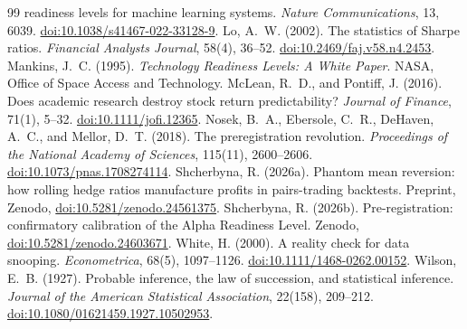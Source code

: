 \documentclass[11pt]{article}
\begin{document}
\begin{thebibliography}{99}
readiness levels for machine learning systems. \emph{Nature Communications}, 13, 6039. \href{https://doi.org/10.1038/s41467-022-33128-9}{doi:10.1038/s41467-022-33128-9}.
 Lo, A.~W. (2002). The statistics of Sharpe ratios. \emph{Financial Analysts Journal},
58(4), 36--52. \href{https://doi.org/10.2469/faj.v58.n4.2453}{doi:10.2469/faj.v58.n4.2453}.
 Mankins, J.~C. (1995). \emph{Technology Readiness Levels: A White Paper}. NASA,
Office of Space Access and Technology.
 McLean, R.~D., and Pontiff, J. (2016). Does academic research destroy stock
return predictability? \emph{Journal of Finance}, 71(1), 5--32. \href{https://doi.org/10.1111/jofi.12365}{doi:10.1111/jofi.12365}.
 Nosek, B.~A., Ebersole, C.~R., DeHaven, A.~C., and Mellor, D.~T. (2018). The
preregistration revolution. \emph{Proceedings of the National Academy of Sciences}, 115(11), 2600--2606. \href{https://doi.org/10.1073/pnas.1708274114}{doi:10.1073/pnas.1708274114}.
 Shcherbyna, R. (2026a). Phantom mean reversion: how rolling hedge ratios
manufacture profits in pairs-trading backtests. Preprint, Zenodo, \href{https://doi.org/10.5281/zenodo.24561375}{doi:10.5281/zenodo.24561375}.
 Shcherbyna, R. (2026b). Pre-registration: confirmatory calibration of
the Alpha Readiness Level. Zenodo, \href{https://doi.org/10.5281/zenodo.24603671}{doi:10.5281/zenodo.24603671}.
 White, H. (2000). A reality check for data snooping. \emph{Econometrica}, 68(5),
1097--1126. \href{https://doi.org/10.1111/1468-0262.00152}{doi:10.1111/1468-0262.00152}.
 Wilson, E.~B. (1927). Probable inference, the law of succession, and statistical
inference. \emph{Journal of the American Statistical Association}, 22(158), 209--212. \href{https://doi.org/10.1080/01621459.1927.10502953}{doi:10.1080/01621459.1927.10502953}.
\end{thebibliography}
\end{document}
